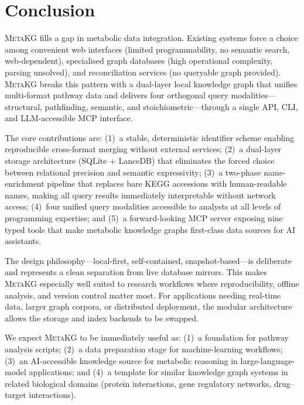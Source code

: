 \documentclass[10pt]{article}
\begin{document}
\section{Conclusion}
\label{sec:conclusion}

\textsc{MetaKG} fills a gap in metabolic data integration. Existing systems
force a choice among convenient web interfaces (limited programmability, no
semantic search, web-dependent), specialised graph databases (high operational
complexity, parsing unsolved), and reconciliation services (no queryable graph
provided). \textsc{MetaKG} breaks this pattern with a dual-layer local
knowledge graph that unifies multi-format pathway data and delivers four
orthogonal query modalities---structural, pathfinding, semantic, and
stoichiometric---through a single API, CLI, and LLM-accessible MCP interface.

The core contributions are: (1)~a stable, deterministic identifier scheme
enabling reproducible cross-format merging without external services; (2)~a
dual-layer storage architecture (SQLite + LanceDB) that eliminates the forced
choice between relational precision and semantic expressivity; (3)~a
two-phase name-enrichment pipeline that replaces bare KEGG accessions with
human-readable names, making all query results immediately interpretable
without network access; (4)~four unified query modalities accessible to
analysts at all levels of programming expertise; and (5)~a forward-looking
MCP server exposing nine typed tools that make metabolic knowledge graphs
first-class data sources for AI assistants.

The design philosophy---local-first, self-contained, snapshot-based---is
deliberate and represents a clean separation from live database mirrors. This
makes \textsc{MetaKG} especially well suited to research workflows where
reproducibility, offline analysis, and version control matter most. For
applications needing real-time data, larger graph corpora, or distributed
deployment, the modular architecture allows the storage and index backends to
be swapped.

We expect \textsc{MetaKG} to be immediately useful as: (1)~a foundation for
pathway analysis scripts; (2)~a data preparation stage for machine-learning
workflows; (3)~an AI-accessible knowledge source for metabolic reasoning in
large-language-model applications; and (4)~a template for similar knowledge
graph systems in related biological domains (protein interactions, gene
regulatory networks, drug--target interactions).
\end{document}
